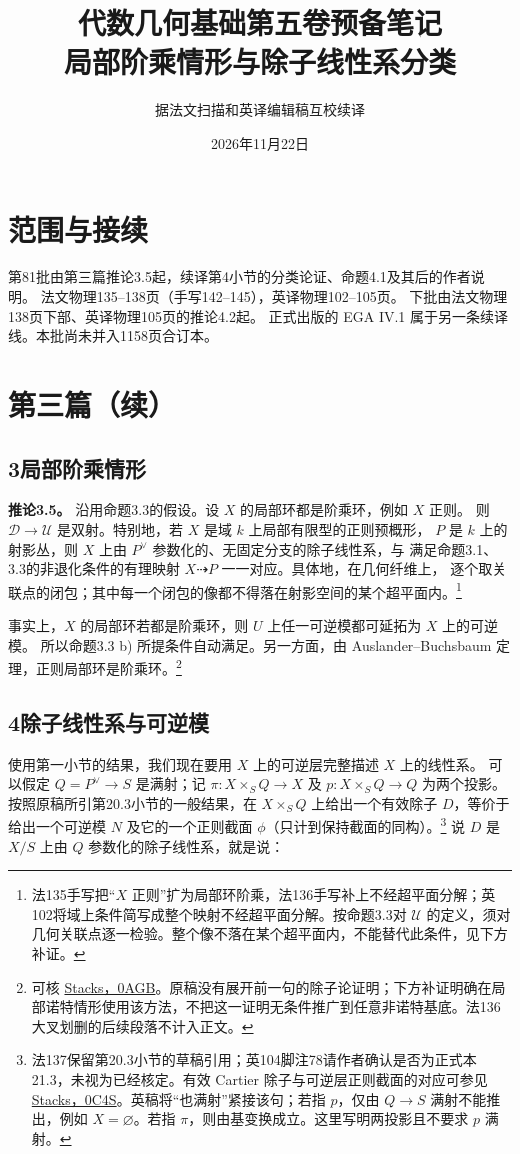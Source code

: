 \documentclass[openany,fontset=fandol]{ctexbook}
\begin{document}
\title{代数几何基础第五卷预备笔记\\局部阶乘情形与除子线性系分类}
\author{据法文扫描和英译编辑稿互校续译}
\date{2026年11月22日}
\maketitle
\chapter*{范围与接续}
第81批由第三篇推论3.5起，续译第4小节的分类论证、命题4.1及其后的作者说明。
法文物理135--138页（手写142--145），英译物理102--105页。
下批由法文物理138页下部、英译物理105页的推论4.2起。
正式出版的 EGA IV.1 属于另一条续译线。本批尚未并入1158页合订本。

\chapter*{第三篇（续）}
\section*{3\quad 局部阶乘情形}
\noindent\textbf{推论3.5。}
沿用命题3.3的假设。设 \(X\) 的局部环都是阶乘环，例如 \(X\) 正则。
则 \(\mathcal D\to\mathcal U\) 是双射。特别地，若 \(X\) 是域 \(k\) 上局部有限型的正则预概形，
\(P\) 是 \(k\) 上的射影丛，则 \(X\) 上由 \(P^\vee\) 参数化的、无固定分支的除子线性系，与
满足命题3.1、3.3的非退化条件的有理映射 \(X\dashrightarrow P\) 一一对应。具体地，在几何纤维上，
逐个取关联点的闭包；其中每一个闭包的像都不得落在射影空间的某个超平面内。\footnote{法135手写把“\(X\) 正则”扩为局部环阶乘，法136手写补上不经超平面分解；英102将域上条件简写成整个映射不经超平面分解。按命题3.3对 \(\mathcal U\) 的定义，须对几何关联点逐一检验。整个像不落在某个超平面内，不能替代此条件，见下方补证。}

事实上，\(X\) 的局部环若都是阶乘环，则 \(U\) 上任一可逆模都可延拓为 \(X\) 上的可逆模。
所以命题3.3 b) 所提条件自动满足。另一方面，由 Auslander--Buchsbaum 定理，正则局部环是阶乘环。\footnote{可核 \href{https://stacks.math.columbia.edu/tag/0AGB}{Stacks，0AGB}。原稿没有展开前一句的除子论证明；下方补证明确在局部诺特情形使用该方法，不把这一证明无条件推广到任意非诺特基底。法136大叉划删的后续段落不计入正文。}

\section*{4\quad 除子线性系与可逆模}
使用第一小节的结果，我们现在要用 \(X\) 上的可逆层完整描述 \(X\) 上的线性系。
可以假定 \(Q=P^\vee\to S\) 是满射；记 \(\pi:X\times_S Q\to X\) 及 \(p:X\times_S Q\to Q\) 为两个投影。
按照原稿所引第20.3小节的一般结果，在 \(X\times_S Q\) 上给出一个有效除子 \(D\)，等价于给出一个可逆模 \(N\) 及它的一个正则截面 \(\phi\)（只计到保持截面的同构）。\footnote{法137保留第20.3小节的草稿引用；英104脚注78请作者确认是否为正式本21.3，未视为已经核定。有效 Cartier 除子与可逆层正则截面的对应可参见 \href{https://stacks.math.columbia.edu/tag/0C4S}{Stacks，0C4S}。英稿将“也满射”紧接该句；若指 \(p\)，仅由 \(Q\to S\) 满射不能推出，例如 \(X=\varnothing\)。若指 \(\pi\)，则由基变换成立。这里写明两投影且不要求 \(p\) 满射。}
说 \(D\) 是 \(X/S\) 上由 \(Q\) 参数化的除子线性系，就是说：
\end{document}
